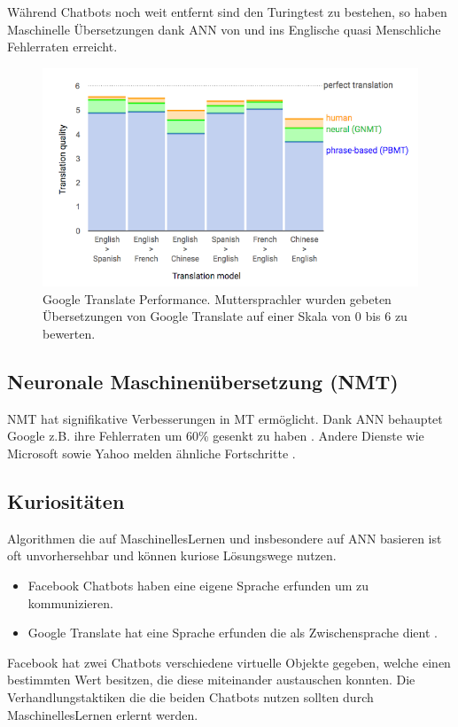 \documentclass{thesisclass}
\begin{document}
 Während Chatbots noch weit entfernt sind den Turingtest zu bestehen, so haben Maschinelle Übersetzungen dank \gls{ANN} von und ins Englische quasi Menschliche Fehlerraten erreicht\cite{googleaiblog_2016}.
 
\begin{figure}[H]
  \center
  \includegraphics[width=\textwidth]{images/MTGoogle.png}
  \caption{Google Translate Performance. Muttersprachler wurden gebeten Übersetzungen von Google Translate auf einer Skala von 0 bis 6 zu bewerten. \cite{googleaiblog_2016}}
  \label{fig:GoogleTranslate Performance}
\end{figure}

\subsection{Neuronale Maschinenübersetzung (\gls{NMT})}
\gls{NMT} hat signifikative Verbesserungen in \gls{MT} ermöglicht. Dank \gls{ANN} behauptet Google z.B. ihre Fehlerraten um 60\% gesenkt zu haben \cite{wu2016google}. Andere Dienste wie Microsoft sowie Yahoo melden ähnliche Fortschritte \cite{Microsoft2018}.

\subsection{Kuriositäten}

Algorithmen die auf \gls{MaschinellesLernen} und insbesondere auf \gls{ANN} basieren ist oft unvorhersehbar und können kuriose Lösungswege nutzen.
\begin{itemize}
	\item Facebook Chatbots haben eine eigene Sprache erfunden um zu kommunizieren\cite{wilson_2018}.
	\item Google Translate hat eine Sprache erfunden die als Zwischensprache dient \cite{googleAiblog_2016Translation}.
\end{itemize}
Facebook hat zwei Chatbots verschiedene virtuelle Objekte gegeben, welche einen bestimmten Wert besitzen, die diese miteinander austauschen konnten. Die Verhandlungstaktiken die die beiden Chatbots nutzen sollten durch \gls{MaschinellesLernen} erlernt werden.
\end{document}
